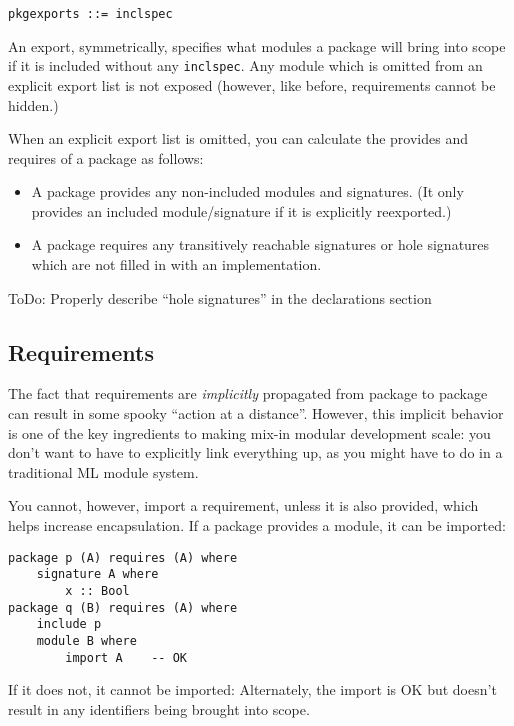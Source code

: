 \documentclass{article}
\newcommand{\Red}[1]{{\color{red} #1}}
\begin{document}
\begin{verbatim}
pkgexports ::= inclspec
\end{verbatim}

An export, symmetrically, specifies what modules a package will bring
into scope if it is included without any \verb|inclspec|.  Any module
which is omitted from an explicit export list is not exposed (however,
like before, requirements cannot be hidden.)

When an explicit export list is omitted, you can calculate the provides
and requires of a package as follows:

\begin{itemize}
    \item A package provides any non-included modules and signatures.
        (It only provides an included module/signature if it is explicitly
        reexported.)
    \item A package requires any transitively reachable signatures or
        hole signatures which are not filled in with an implementation.
\end{itemize}

\Red{ToDo: Properly describe ``hole signatures'' in the declarations section}

\subsection{Requirements}

The fact that requirements are \emph{implicitly} propagated from package
to package can result in some spooky ``action at a distance''. However,
this implicit behavior is one of the key ingredients to making mix-in
modular development scale: you don't want to have to explicitly link
everything up, as you might have to do in a traditional ML module
system.

You cannot, however, import a requirement, unless it is also provided,
which helps increase encapsulation.  If a package provides a
module, it can be imported:

\begin{verbatim}
package p (A) requires (A) where
    signature A where
        x :: Bool
package q (B) requires (A) where
    include p
    module B where
        import A    -- OK
\end{verbatim}

If it does not, it cannot be imported:
\Red{Alternately, the import is OK but doesn't result in any identifiers
being brought into scope.}
\end{document}
